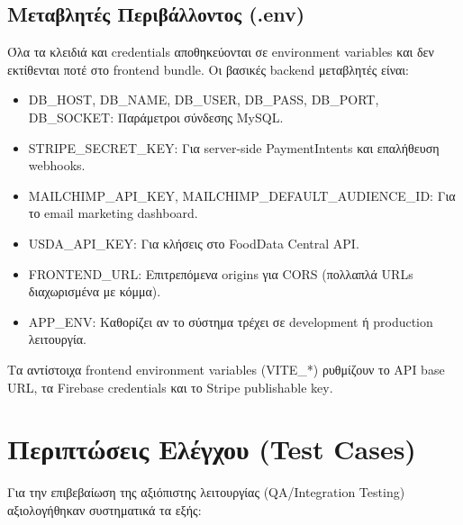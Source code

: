 \documentclass[12pt,a4paper]{report}
\begin{document}
\subsection{Μεταβλητές Περιβάλλοντος (.env)}
Όλα τα κλειδιά και \textenglish{credentials} αποθηκεύονται σε \textenglish{environment variables} και δεν εκτίθενται ποτέ στο \textenglish{frontend bundle}. Οι βασικές \textenglish{backend} μεταβλητές είναι:
\begin{itemize}[label=•]
    \item \textenglish{DB\_HOST, DB\_NAME, DB\_USER, DB\_PASS, DB\_PORT, DB\_SOCKET:} Παράμετροι σύνδεσης \textenglish{MySQL}.
    \item \textenglish{STRIPE\_SECRET\_KEY:} Για \textenglish{server-side PaymentIntents} και επαλήθευση \textenglish{webhooks}.
    \item \textenglish{MAILCHIMP\_API\_KEY, MAILCHIMP\_DEFAULT\_AUDIENCE\_ID:} Για το \textenglish{email marketing dashboard}.
    \item \textenglish{USDA\_API\_KEY:} Για κλήσεις στο \textenglish{FoodData Central API}.
    \item \textenglish{FRONTEND\_URL:} Επιτρεπόμενα \textenglish{origins} για \textenglish{CORS} (πολλαπλά \textenglish{URLs} διαχωρισμένα με κόμμα).
    \item \textenglish{APP\_ENV:} Καθορίζει αν το σύστημα τρέχει σε \textenglish{development} ή \textenglish{production} λειτουργία.
\end{itemize}
Τα αντίστοιχα \textenglish{frontend} \textenglish{environment variables} (\textenglish{VITE\_*}) ρυθμίζουν το \textenglish{API base URL}, τα \textenglish{Firebase credentials} και το \textenglish{Stripe publishable key}.

\newpage

\section{Περιπτώσεις Ελέγχου (Test Cases)}
Για την επιβεβαίωση της αξιόπιστης λειτουργίας (\textenglish{QA/Integration Testing}) αξιολογήθηκαν συστηματικά τα εξής:
\end{document}
